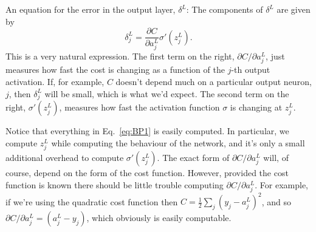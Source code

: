 \documentclass[a4paper,twoside,10pt]{book}
\begin{document}
An equation for the error in the output layer, $\delta^L$: The components of $\delta^L$ are given by
\begin{equation}
	\delta^L_j = \frac{\partial C}{\partial a^L_j} \sigma'(z^L_j).
	\tag{BP1}
	\label{eq:BP1}
\end{equation}
This is a very natural expression. The first term on the right, $\partial{}C/\partial{}a^L_j$, just measures how fast the cost is changing as a function of the $j$-th output activation. If, for example, $C$ doesn't depend much on a particular output neuron, $j$, then $\delta^L_j$ will be small, which is what we'd expect. The second term on the right, $\sigma'(z^L_j)$, measures how fast the activation function $\sigma$ is changing at $z^L_j$.

Notice that everything in Eq.~\ref{eq:BP1} is easily computed. In particular, we compute $z^L_j$ while computing the behaviour of the network, and it's only a small additional overhead to compute $\sigma'(z^L_j)$. The exact form of $\partial{}C/\partial{}a^L_j$ will, of course, depend on the form of the cost function. However, provided the cost function is known there should be little trouble computing $\partial{}C/\partial{}a^L_j$. For example, if we're using the quadratic cost function then $C=\frac12\sum_j(y_j-a^L_j)^2$, and so $\partial{}C/\partial{}a^L_j=(a^L_j-y_j)$, which obviously is easily computable.
\end{document}
